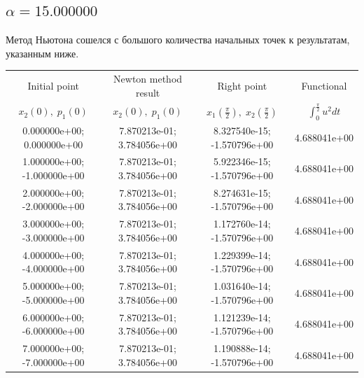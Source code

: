 \documentclass[titlepage]{article}
\def\l{\left}
\def\r{\right}
\begin{document}
\subsection{$\alpha = 15.000000$} 
Метод Ньютона сошелся с большого количества начальных точек к результатам, указанным ниже. \\ 
\begin{tabular}{ | c | c | c | c |} 
\hline 
Initial point  & Newton method result & Right point & Functional 
 \\ $x_2(0), \; p_1(0)$ & $x_2(0), \; p_1(0)$ & $x_1\l(\frac{\pi}{2}\r), \; x_2\l(\frac{\pi}{2}\r)$ & $\int_{0}^{\frac{\pi}{2}}u^2dt$  \\ \hline 
0.000000e+00; 0.000000e+00 & 7.870213e-01; 3.784056e+00 & 8.327540e-15; -1.570796e+00 & 4.688041e+00 \\ \hline 
1.000000e+00; -1.000000e+00 & 7.870213e-01; 3.784056e+00 & 5.922346e-15; -1.570796e+00 & 4.688041e+00 \\ \hline 
2.000000e+00; -2.000000e+00 & 7.870213e-01; 3.784056e+00 & 8.274631e-15; -1.570796e+00 & 4.688041e+00 \\ \hline 
3.000000e+00; -3.000000e+00 & 7.870213e-01; 3.784056e+00 & 1.172760e-14; -1.570796e+00 & 4.688041e+00 \\ \hline 
4.000000e+00; -4.000000e+00 & 7.870213e-01; 3.784056e+00 & 1.229399e-14; -1.570796e+00 & 4.688041e+00 \\ \hline 
5.000000e+00; -5.000000e+00 & 7.870213e-01; 3.784056e+00 & 1.031640e-14; -1.570796e+00 & 4.688041e+00 \\ \hline 
6.000000e+00; -6.000000e+00 & 7.870213e-01; 3.784056e+00 & 1.121239e-14; -1.570796e+00 & 4.688041e+00 \\ \hline 
7.000000e+00; -7.000000e+00 & 7.870213e-01; 3.784056e+00 & 1.190888e-14; -1.570796e+00 & 4.688041e+00 \\ \hline 
\end{tabular} 
\end{document}
